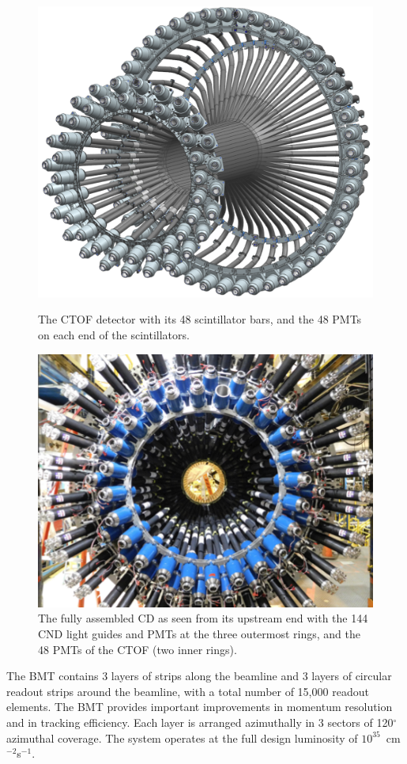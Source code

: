 \documentclass[final,3p,twocolumn]{elsarticle}
\begin{document}
\begin{figure}[t!]
\includegraphics[width=1.0\columnwidth]{ctof-design.png}
\caption{The CTOF detector with its 48 scintillator bars, and the 48 PMTs on each end of the scintillators.}
\label{ctof} 
\vspace{0.5cm}\centerline{\includegraphics[width=0.9\columnwidth]{cnd-ctof.png}}
\caption{The fully assembled CD as seen from its upstream end with the 144 CND light guides and PMTs at the
  three outermost rings, and the 48 PMTs of the CTOF (two inner rings).} 
\label{ctof-cnd}
\end{figure} 
The BMT contains 3 layers of strips along the beamline and 3 layers of circular readout strips around the beamline,
with a total number of 15,000 readout elements. The BMT provides important improvements in momentum resolution
and in tracking efficiency. Each layer is arranged azimuthally in 3 sectors of 120$^\circ$ azimuthal coverage. The
system operates at the full design luminosity of $10^{35}$~cm$^{-2}$s$^{-1}$.
\end{document}
